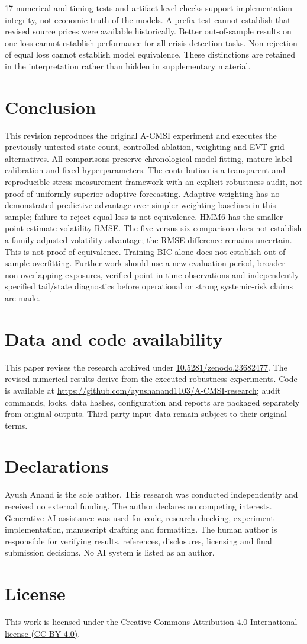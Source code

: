 \documentclass[11pt]{article}
\begin{document}
17 numerical and timing tests and artifact-level checks support implementation integrity,
not economic truth of the models. A prefix test cannot establish that revised source prices were
available historically. Better out-of-sample results on one loss cannot establish performance for
all crisis-detection tasks. Non-rejection of equal loss cannot establish model equivalence. These
distinctions are retained in the interpretation rather than hidden in supplementary material.

\section{Conclusion}
This revision reproduces the original A-CMSI experiment and executes the previously untested
state-count, controlled-ablation, weighting and EVT-grid alternatives. All comparisons preserve
chronological model fitting, mature-label calibration and fixed hyperparameters. The contribution
is a transparent and reproducible stress-measurement framework with an explicit robustness audit,
not proof of uniformly superior adaptive forecasting. Adaptive weighting has no demonstrated predictive
advantage over simpler weighting baselines in this sample; failure to reject equal loss is not equivalence.
HMM6 has the smaller point-estimate volatility RMSE. The five-versus-six comparison does not establish a family-adjusted volatility advantage; the RMSE difference remains uncertain. This is not proof of equivalence. Training BIC alone does not establish out-of-sample overfitting.
Further work should use a new evaluation period, broader non-overlapping exposures, verified
point-in-time observations and independently specified tail/state diagnostics before operational
or strong systemic-risk claims are made.

\section*{Data and code availability}
This paper revises the research archived under
\href{https://doi.org/10.5281/zenodo.23682477}{10.5281/zenodo.23682477}. The revised numerical results derive from the
executed robustness experiments. Code is available at
\url{https://github.com/ayushanand1103/A-CMSI-research}; audit commands, locks, data hashes,
configuration and reports are packaged separately from original outputs. Third-party input data
remain subject to their original terms.

\section*{Declarations}
Ayush Anand is the sole author. This research was conducted independently and received no external
funding. The author declares no competing interests. Generative-AI assistance
was used for code, research checking, experiment implementation, manuscript drafting and formatting.
The human author is responsible for verifying results, references, disclosures, licensing and final
submission decisions. No AI system is listed as an author.

\section*{License}
This work is licensed under the
\href{https://creativecommons.org/licenses/by/4.0/}{Creative Commons Attribution 4.0 International license (CC BY 4.0)}.



\end{document}
